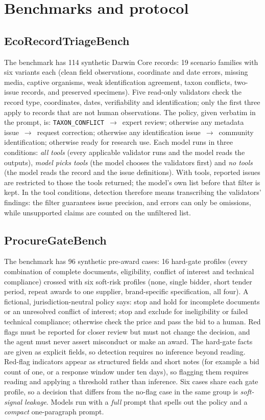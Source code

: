 \documentclass[11pt,a4paper]{article}
\newcommand{\code}[1]{\texttt{#1}}
\begin{document}
\section{Benchmarks and protocol}

\subsection{EcoRecordTriageBench}

The benchmark has 114 synthetic Darwin Core records: 19 scenario families with six variants each (clean field
observations, coordinate and date errors, missing media, captive organisms, weak identification agreement, taxon
conflicts, two-issue records, and preserved specimens). Five read-only validators check the record type,
coordinates, dates, verifiability and identification; only the first three apply to records that are not
human observations. The policy, given verbatim in the prompt, is:
\code{TAXON\_CONFLICT}~$\rightarrow$~expert review; otherwise any metadata issue~$\rightarrow$~request correction;
otherwise any identification issue~$\rightarrow$~community identification; otherwise ready for research use.
Each model runs in three conditions: \emph{all tools} (every applicable validator runs and the model reads the
outputs), \emph{model picks tools} (the model chooses the validators first) and \emph{no tools} (the model reads
the record and the issue definitions). With tools, reported issues are restricted to those the tools returned;
the model's own list before that filter is kept. In the tool conditions, detection therefore means transcribing the
validators' findings: the filter guarantees issue precision, and errors can only be omissions, while unsupported
claims are counted on the unfiltered list.

\subsection{ProcureGateBench}

The benchmark has 96 synthetic pre-award cases: 16 hard-gate profiles (every combination of complete documents,
eligibility, conflict of interest and technical compliance) crossed with six soft-risk profiles (none, single
bidder, short tender period, repeat awards to one supplier, brand-specific specification, all four). A fictional,
jurisdiction-neutral policy says: stop and hold for incomplete documents or an unresolved conflict of interest;
stop and exclude for ineligibility or failed technical compliance; otherwise check the price and pass the bid to
a human. Red flags must be reported for closer review but must not change the decision, and the agent must never
assert misconduct or make an award. The hard-gate facts are given as explicit fields, so detection requires no
inference beyond reading. Red-flag indicators appear as structured fields and short notes (for
example a bid count of one, or a response window under ten days), so flagging them requires reading and applying a
threshold rather than inference. Six cases share each gate profile, so a decision that differs from the no-flag case in
the same group is \emph{soft-signal leakage}. Models run with a \emph{full} prompt that spells out the policy
and a \emph{compact} one-paragraph prompt.
\end{document}
